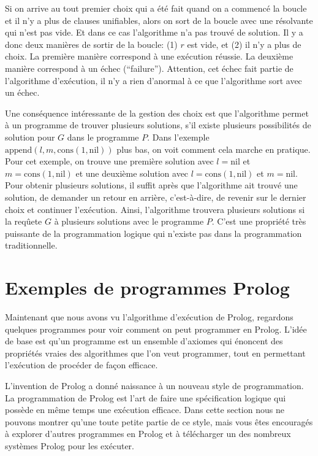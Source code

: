 Si on arrive au tout premier choix qui a été fait quand on a commencé la boucle et il n'y a plus de clauses unifiables,
alors on sort de la boucle avec une résolvante qui n'est pas vide. Et dans ce cas l'algorithme n'a pas trouvé de solution. 
Il y a donc deux manières de sortir de la boucle: (1) $r$ est vide, et (2) il n'y a plus de choix.
La première manière correspond à une exécution réussie.
La deuxième manière correspond à un échec (``failure'').
Attention, cet échec fait partie de l'algorithme d'exécution, il n'y a rien d'anormal à ce que l'algorithme sort avec un échec.

Une conséquence intéressante de la gestion des choix est que
l'algorithme permet à un programme de trouver plusieurs solutions, s'il existe plusieurs possibilités
de solution pour $G$ dans le programme $P$.
Dans l'exemple $\mathrm{append}(l,m,\mathrm{cons}(1,\mathrm{nil}))$ plus bas,
on voit comment cela marche en pratique.
Pour cet exemple, on trouve une première solution avec $l=\mathrm{nil}$ et $m=\mathrm{cons}(1,\mathrm{nil})$ et une deuxième solution
avec $l=\mathrm{cons}(1,\mathrm{nil})$ et $m=\mathrm{nil}$.
Pour obtenir plusieurs solutions, il suffit après que l'algorithme ait trouvé une solution,
de demander un retour en arrière, c'est-à-dire, de revenir sur le dernier choix et continuer l'exécution.
Ainsi, l'algorithme trouvera plusieurs solutions si la reqûete $G$ à plusieurs solutions avec le programme $P$.
C'est une propriété très puissante de la programmation logique qui n'existe pas dans la programmation traditionnelle.


\section{Exemples de programmes Prolog}

Maintenant que nous avons vu l'algorithme d'exécution de Prolog,
regardons quelques programmes pour voir comment on peut programmer en Prolog.
L'idée de base est qu'un programme est un ensemble d'axiomes qui énoncent des propriétés vraies
des algorithmes que l'on veut programmer, tout en permettant l'exécution de procéder de façon efficace.

L'invention de Prolog a donné naissance à un nouveau style de programmation.
La programmation de Prolog est l'art de faire une spécification logique qui possède en même temps une exécution efficace.
Dans cette section nous ne pouvons montrer qu'une toute petite partie de ce style,
mais vous êtes encouragés à explorer d'autres programmes en Prolog et à télécharger
un des nombreux systèmes Prolog pour les exécuter.

